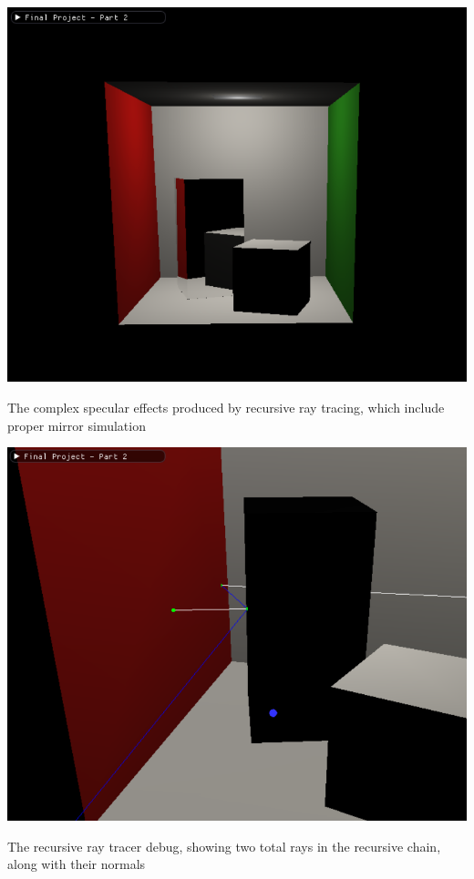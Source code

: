 \documentclass{article}
\begin{document}
    \begin{center}
        \includegraphics[scale=0.70]{images/recursive_ray_tracer_showcase.png}

        The complex specular effects produced by recursive ray tracing, which include proper mirror simulation

        \vspace{5mm}

        \includegraphics[scale=0.70]{images/recursive_ray_tracer_debug.png}

        The recursive ray tracer debug, showing two total rays in the recursive chain, along with their normals
    \end{center}
\end{document}
